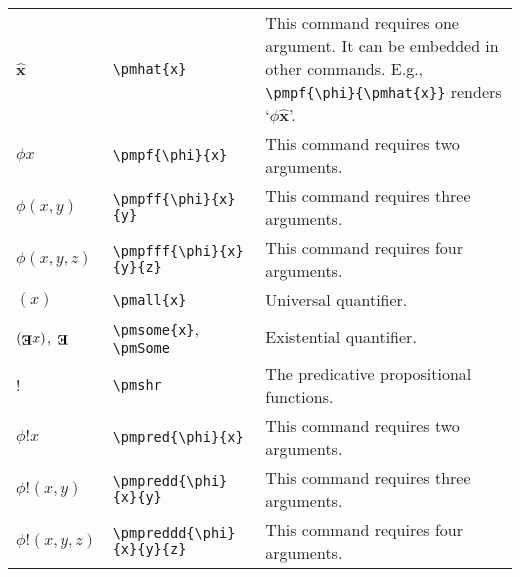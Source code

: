 \documentclass[12pt]{article}
\newcommand{\pmall}[1]{(#1)}
\newcommand{\pmsome}[1]{(\text{\raisebox{.5em}{\rotatebox{180}{\textbf{E}}}}#1)} %
\newcommand{\pmSome}{\text{\raisebox{.5em}{\rotatebox{180}{\textbf{E}}}}}
\newcommand{\pmhat}[1]{\boldsymbol{\hat{\text{$#1$}}}}
\newcommand{\pmpf}[2]{#1#2} %
\newcommand{\pmpff}[3]{#1(#2, #3)} %
\newcommand{\pmpfff}[4]{#1(#2, #3, #4)} %
\newcommand{\pmshr}{\textbf{!}} %
\newcommand{\pmpred}[2]{#1\pmshr#2} %
\newcommand{\pmpredd}[3]{#1\pmshr(#2, #3)} %
\newcommand{\pmpreddd}[4]{#1\pmshr(#2, #3, #4)} %
\begin{document}
\begin{tabular}{@{}p{3cm} | p{5cm} | p{8.25cm}}
	$\pmhat{x}$ & \verb|\pmhat{x}| & This command requires one argument. It can be embedded in other commands. E.g., \verb|\pmpf{\phi}{\pmhat{x}}| renders `$\pmpf{\phi}{\pmhat{x}}$'. \\
	$\pmpf{\phi}{x}$ & \verb|\pmpf{\phi}{x}| & This command requires two arguments. \\
	$\pmpff{\phi}{x}{y}$ & \verb|\pmpff{\phi}{x}{y}| & This command requires three arguments. \\
	$\pmpfff{\phi}{x}{y}{z}$ & \verb|\pmpfff{\phi}{x}{y}{z}| & This command requires four arguments. \\
	$\pmall{x}$ &\verb|\pmall{x}| & Universal quantifier. \\
	$\pmsome{x}$, $\pmSome$ & \verb|\pmsome{x}|, \verb|\pmSome| & Existential quantifier. \\
	$\pmshr$ & \verb|\pmshr| & The predicative propositional functions. \\
	$\pmpred{\phi}{x}$ & \verb|\pmpred{\phi}{x}| & This command requires two arguments. \\
	$\pmpredd{\phi}{x}{y}$ & \verb|\pmpredd{\phi}{x}{y}| & This command requires three arguments. \\
	$\pmpreddd{\phi}{x}{y}{z}$ & \verb|\pmpreddd{\phi}{x}{y}{z}| & This command requires four arguments.
\end{tabular}
\end{document}

